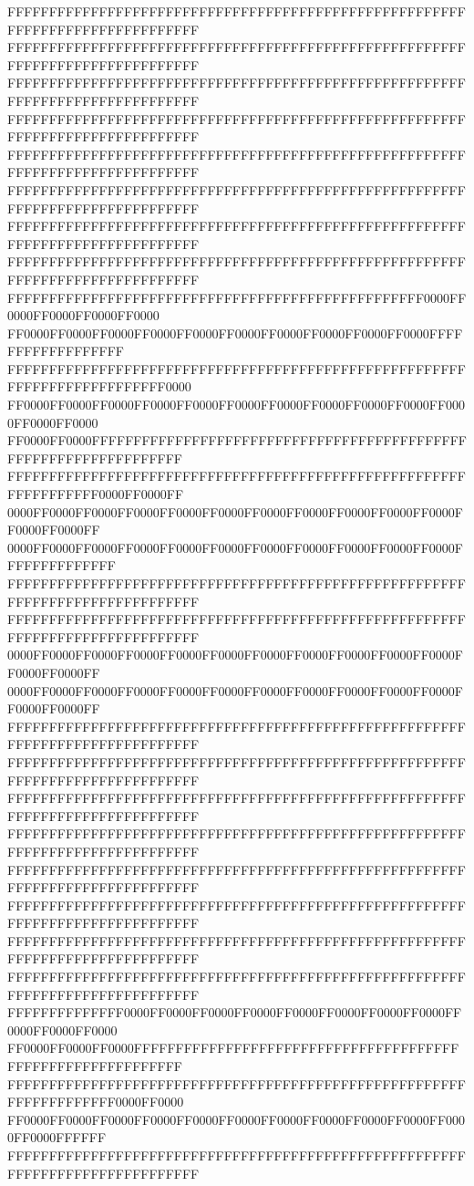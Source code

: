 FFFFFFFFFFFFFFFFFFFFFFFFFFFFFFFFFFFFFFFFFFFFFFFFFFFFFFFFFFFFFFFFFFFFFFFFFFFFFF
FFFFFFFFFFFFFFFFFFFFFFFFFFFFFFFFFFFFFFFFFFFFFFFFFFFFFFFFFFFFFFFFFFFFFFFFFFFFFF
FFFFFFFFFFFFFFFFFFFFFFFFFFFFFFFFFFFFFFFFFFFFFFFFFFFFFFFFFFFFFFFFFFFFFFFFFFFFFF
FFFFFFFFFFFFFFFFFFFFFFFFFFFFFFFFFFFFFFFFFFFFFFFFFFFFFFFFFFFFFFFFFFFFFFFFFFFFFF
FFFFFFFFFFFFFFFFFFFFFFFFFFFFFFFFFFFFFFFFFFFFFFFFFFFFFFFFFFFFFFFFFFFFFFFFFFFFFF
FFFFFFFFFFFFFFFFFFFFFFFFFFFFFFFFFFFFFFFFFFFFFFFFFFFFFFFFFFFFFFFFFFFFFFFFFFFFFF
FFFFFFFFFFFFFFFFFFFFFFFFFFFFFFFFFFFFFFFFFFFFFFFFFFFFFFFFFFFFFFFFFFFFFFFFFFFFFF
FFFFFFFFFFFFFFFFFFFFFFFFFFFFFFFFFFFFFFFFFFFFFFFFFFFFFFFFFFFFFFFFFFFFFFFFFFFFFF
FFFFFFFFFFFFFFFFFFFFFFFFFFFFFFFFFFFFFFFFFFFFFFFFFF0000FF0000FF0000FF0000FF0000
FF0000FF0000FF0000FF0000FF0000FF0000FF0000FF0000FF0000FF0000FFFFFFFFFFFFFFFFFF
FFFFFFFFFFFFFFFFFFFFFFFFFFFFFFFFFFFFFFFFFFFFFFFFFFFFFFFFFFFFFFFFFFFFFFFFFF0000
FF0000FF0000FF0000FF0000FF0000FF0000FF0000FF0000FF0000FF0000FF0000FF0000FF0000
FF0000FF0000FFFFFFFFFFFFFFFFFFFFFFFFFFFFFFFFFFFFFFFFFFFFFFFFFFFFFFFFFFFFFFFFFF
FFFFFFFFFFFFFFFFFFFFFFFFFFFFFFFFFFFFFFFFFFFFFFFFFFFFFFFFFFFFFFFFFF0000FF0000FF
0000FF0000FF0000FF0000FF0000FF0000FF0000FF0000FF0000FF0000FF0000FF0000FF0000FF
0000FF0000FF0000FF0000FF0000FF0000FF0000FF0000FF0000FF0000FF0000FFFFFFFFFFFFFF
FFFFFFFFFFFFFFFFFFFFFFFFFFFFFFFFFFFFFFFFFFFFFFFFFFFFFFFFFFFFFFFFFFFFFFFFFFFFFF
FFFFFFFFFFFFFFFFFFFFFFFFFFFFFFFFFFFFFFFFFFFFFFFFFFFFFFFFFFFFFFFFFFFFFFFFFFFFFF
0000FF0000FF0000FF0000FF0000FF0000FF0000FF0000FF0000FF0000FF0000FF0000FF0000FF
0000FF0000FF0000FF0000FF0000FF0000FF0000FF0000FF0000FF0000FF0000FF0000FF0000FF
FFFFFFFFFFFFFFFFFFFFFFFFFFFFFFFFFFFFFFFFFFFFFFFFFFFFFFFFFFFFFFFFFFFFFFFFFFFFFF
FFFFFFFFFFFFFFFFFFFFFFFFFFFFFFFFFFFFFFFFFFFFFFFFFFFFFFFFFFFFFFFFFFFFFFFFFFFFFF
FFFFFFFFFFFFFFFFFFFFFFFFFFFFFFFFFFFFFFFFFFFFFFFFFFFFFFFFFFFFFFFFFFFFFFFFFFFFFF
FFFFFFFFFFFFFFFFFFFFFFFFFFFFFFFFFFFFFFFFFFFFFFFFFFFFFFFFFFFFFFFFFFFFFFFFFFFFFF
FFFFFFFFFFFFFFFFFFFFFFFFFFFFFFFFFFFFFFFFFFFFFFFFFFFFFFFFFFFFFFFFFFFFFFFFFFFFFF
FFFFFFFFFFFFFFFFFFFFFFFFFFFFFFFFFFFFFFFFFFFFFFFFFFFFFFFFFFFFFFFFFFFFFFFFFFFFFF
FFFFFFFFFFFFFFFFFFFFFFFFFFFFFFFFFFFFFFFFFFFFFFFFFFFFFFFFFFFFFFFFFFFFFFFFFFFFFF
FFFFFFFFFFFFFFFFFFFFFFFFFFFFFFFFFFFFFFFFFFFFFFFFFFFFFFFFFFFFFFFFFFFFFFFFFFFFFF
FFFFFFFFFFFFFF0000FF0000FF0000FF0000FF0000FF0000FF0000FF0000FF0000FF0000FF0000
FF0000FF0000FF0000FFFFFFFFFFFFFFFFFFFFFFFFFFFFFFFFFFFFFFFFFFFFFFFFFFFFFFFFFFFF
FFFFFFFFFFFFFFFFFFFFFFFFFFFFFFFFFFFFFFFFFFFFFFFFFFFFFFFFFFFFFFFFFFFF0000FF0000
FF0000FF0000FF0000FF0000FF0000FF0000FF0000FF0000FF0000FF0000FF0000FF0000FFFFFF
FFFFFFFFFFFFFFFFFFFFFFFFFFFFFFFFFFFFFFFFFFFFFFFFFFFFFFFFFFFFFFFFFFFFFFFFFFFFFF
